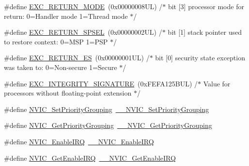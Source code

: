 \begin{DoxyCompactItemize}
\item 
\#define \hyperlink{group___c_m_s_i_s___core___n_v_i_c_functions_gabb65f847769a7807395b2739cc9702d0}{E\+X\+C\+\_\+\+R\+E\+T\+U\+R\+N\+\_\+\+M\+O\+DE}~(0x00000008\+U\+L)     /$\ast$ bit \mbox{[}3\mbox{]} processor mode for return\+: 0=\+Handler mode 1=\+Thread mode      $\ast$/
\item 
\#define \hyperlink{group___c_m_s_i_s___core___n_v_i_c_functions_ga686922b26c29eac540f53a6213627466}{E\+X\+C\+\_\+\+R\+E\+T\+U\+R\+N\+\_\+\+S\+P\+S\+EL}~(0x00000002\+U\+L)     /$\ast$ bit \mbox{[}1\mbox{]} stack pointer used to restore context\+: 0=\+M\+S\+P 1=\+P\+S\+P           $\ast$/
\item 
\#define \hyperlink{group___c_m_s_i_s___core___n_v_i_c_functions_gac939dbf69d3063c76a28516a4ae84db7}{E\+X\+C\+\_\+\+R\+E\+T\+U\+R\+N\+\_\+\+ES}~(0x00000001\+U\+L)     /$\ast$ bit \mbox{[}0\mbox{]} security state exception was taken to\+: 0=\+Non-\/secure 1=\+Secure $\ast$/
\item 
\#define \hyperlink{group___c_m_s_i_s___core___n_v_i_c_functions_ga7d1b21b2d863ccd9e23a3295b3173155}{E\+X\+C\+\_\+\+I\+N\+T\+E\+G\+R\+I\+T\+Y\+\_\+\+S\+I\+G\+N\+A\+T\+U\+RE}~(0x\+F\+E\+F\+A125\+B\+U\+L)     /$\ast$ Value for processors without floating-\/point extension                $\ast$/
\item 
\#define \hyperlink{group___c_m_s_i_s___core___n_v_i_c_functions_ga0e798d5aec68cdd8263db86a76df788f}{N\+V\+I\+C\+\_\+\+Set\+Priority\+Grouping}~\hyperlink{group___c_m_s_i_s___core___n_v_i_c_functions_gafc94dcbaee03e4746ade1f5bb9aaa56d}{\+\_\+\+\_\+\+N\+V\+I\+C\+\_\+\+Set\+Priority\+Grouping}
\item 
\#define \hyperlink{group___c_m_s_i_s___core___n_v_i_c_functions_ga4eeb9214f2264fc23c34ad5de2d3fa11}{N\+V\+I\+C\+\_\+\+Get\+Priority\+Grouping}~\hyperlink{group___c_m_s_i_s___core___n_v_i_c_functions_ga9b894af672df4373eb637f8288845c05}{\+\_\+\+\_\+\+N\+V\+I\+C\+\_\+\+Get\+Priority\+Grouping}
\item 
\#define \hyperlink{group___c_m_s_i_s___core___n_v_i_c_functions_ga57b3064413dbc7459d9646020fdd8bef}{N\+V\+I\+C\+\_\+\+Enable\+I\+RQ}~\hyperlink{group___c_m_s_i_s___core___n_v_i_c_functions_ga71227e1376cde11eda03fcb62f1b33ea}{\+\_\+\+\_\+\+N\+V\+I\+C\+\_\+\+Enable\+I\+RQ}
\item 
\#define \hyperlink{group___c_m_s_i_s___core___n_v_i_c_functions_ga857de13232ec65dd15087eaa15bc4a69}{N\+V\+I\+C\+\_\+\+Get\+Enable\+I\+RQ}~\hyperlink{group___c_m_s_i_s___core___n_v_i_c_functions_gaaeb5e7cc0eaad4e2817272e7bf742083}{\+\_\+\+\_\+\+N\+V\+I\+C\+\_\+\+Get\+Enable\+I\+RQ}

\end{DoxyCompactItemize}
